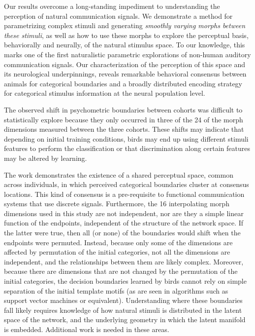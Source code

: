 
Our results overcome a long-standing impediment to understanding the perception of natural communication signals. We demonstrate a method for parametrizing complex stimuli and generating \emph{smoothly varying morphs between these stimuli}, as well as how to use these morphs to explore the perceptual basis, behaviorally and neurally, of the natural stimulus space. To our knowledge, this marks one of the first naturalistic parametric explorations of non-human auditory communication signals. Our characterization of the perception of this space and its neurological underpinnings, reveals remarkable behavioral consensus between animals for categorical boundaries and a broadly distributed encoding strategy for categorical stimulus information at the neural population level.  

The observed shift in psychometric boundaries between cohorts was difficult to statistically explore because they only occurred in three of the 24 of the morph dimensions measured between the three cohorts. These shifts may indicate that depending on initial training conditions, birds may end up using different stimuli features to perform the classification or that discrimination along certain features may be altered by learning.

The work demonstrates the existence of a shared perceptual space, common across individuals, in which perceived categorical boundaries cluster at consensus locations.  This kind of consensus is a pre-requisite to functional communication systems that use discrete signals.  Furthermore, the 16 interpolating morph dimensions used in this study are not independent, nor are they a simple linear function of the endpoints, independent of the structure of the network space. If the latter were true, then all (or none) of the boundaries would shift when the endpoints were permuted. Instead, because only some of the dimensions are affected by permutation of the initial categories, not all the dimensions are independent, and the relationships between them are likely complex. Moreover, because there are dimensions that are not changed by the permutation of the initial categories, the decision boundaries learned by birds cannot rely on simple separation of the initial template motifs (as are seen in algorithms such as support vector machines or equivalent). Understanding where these boundaries fall likely requires knowledge of how natural stimuli is distributed in the latent space of the network, and the underlying geometry in which the latent manifold is embedded. Additional work is needed in these areas. \cite{tims paper}

